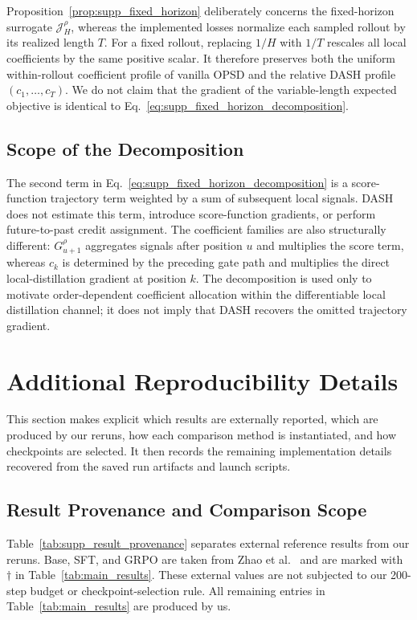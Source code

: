 \documentclass[letterpaper]{article} %
\begin{document}
Proposition~\ref{prop:supp_fixed_horizon} deliberately concerns the
fixed-horizon surrogate $\mathcal J_H^\rho$, whereas the implemented
losses normalize each sampled rollout by its realized length $T$. For
a fixed rollout, replacing $1/H$ with $1/T$ rescales all local
coefficients by the same positive scalar. It therefore preserves both
the uniform within-rollout coefficient profile of vanilla OPSD and the
relative DASH profile $(c_1,\ldots,c_T)$. We do not claim that the
gradient of the variable-length expected objective is identical to
Eq.~\eqref{eq:supp_fixed_horizon_decomposition}.

\subsection{Scope of the Decomposition}
\label{app:scope}

The second term in
Eq.~\eqref{eq:supp_fixed_horizon_decomposition} is a score-function
trajectory term weighted by a sum of subsequent local signals. DASH
does not estimate this term, introduce score-function gradients, or
perform future-to-past credit assignment. The coefficient families are
also structurally different: $G^\rho_{u+1}$ aggregates signals after
position $u$ and multiplies the score term, whereas $c_k$ is determined
by the preceding gate path and multiplies the direct local-distillation
gradient at position $k$. The decomposition is used only to motivate
order-dependent coefficient allocation within the differentiable local
distillation channel; it does not imply that DASH recovers the omitted
trajectory gradient.

\section{Additional Reproducibility Details}
\label{sec:reproducibility}

This section makes explicit which results are externally reported,
which are produced by our reruns, how each comparison method is
instantiated, and how checkpoints are selected. It then records the
remaining implementation details recovered from the saved run
artifacts and launch scripts.

\subsection{Result Provenance and Comparison Scope}
\label{sec:supp_provenance}

Table~\ref{tab:supp_result_provenance} separates external reference
results from our reruns. Base, SFT, and GRPO are taken from Zhao et
al.~\cite{zhao2026selfdistilled} and are marked with $\dagger$ in
Table~\ref{tab:main_results}. These external values are not subjected
to our 200-step budget or checkpoint-selection rule. All remaining
entries in Table~\ref{tab:main_results} are produced by us.
\end{document}
